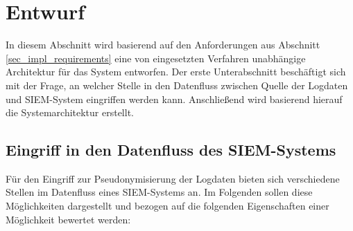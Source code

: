 \section{Entwurf}

\label{sec_impl_architecture}

In diesem Abschnitt wird basierend auf den Anforderungen aus Abschnitt \ref{sec_impl_requirements} eine von eingesetzten Verfahren unabhängige Architektur für das System entworfen. Der erste Unterabschnitt beschäftigt sich mit der Frage, an welcher Stelle in den Datenfluss zwischen Quelle der Logdaten und SIEM-System eingriffen werden kann. Anschließend wird basierend hierauf die Systemarchitektur erstellt.

\subsection{Eingriff in den Datenfluss des SIEM-Systems}

\label{sec_over_dataflow_siem}


Für den Eingriff zur Pseudonymisierung der Logdaten bieten sich verschiedene Stellen im Datenfluss eines SIEM-Systems an. Im Folgenden sollen diese Möglichkeiten dargestellt und bezogen auf die folgenden Eigenschaften einer Möglichkeit bewertet werden:

